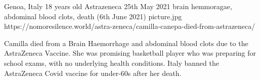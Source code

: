           {Genoa, Italy}
          {18 years old}
          {Astrazeneca}
          {25th May 2021}
          {brain hemmoragae, abdominal blood clots, death (6th June 2021)}
          {picture.jpg}
          {https://nomoresilence.world/astra-zeneca/camilla-canepa-died-from-astrazeneca/}
          {
            
Camilla died from a Brain Haemorrhage and abdominal blood clots due to the
AstraZeneca Vaccine. She was promising basketball player who was preparing for
school exams, with no underlying health conditions. Italy banned the AstraZeneca
Covid vaccine for under-60s after her death.
}
